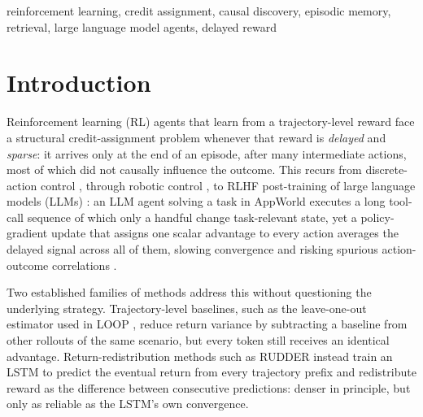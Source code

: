 \documentclass[conference]{IEEEtran}
\begin{document}
\begin{abstract}
explicitly identifying and weighting the causally relevant steps of a trajectory is a more sample-efficient credit-assignment strategy than either an undifferentiated trajectory-level baseline or a learned return-redistribution network; the AppWorld result, constrained to a single seed per arm by the 2-GPU budget available for this project, is reported as a compute-limited demonstration that the same mechanism is compatible with an improvement at a harder, partially observed, natural-language scale, not as an independent statistical confirmation of it.
\end{abstract}

\begin{IEEEkeywords}
reinforcement learning, credit assignment, causal discovery, episodic memory, retrieval, large language model agents, delayed reward
\end{IEEEkeywords}

\section{Introduction}
\label{sec:introduction}

Reinforcement learning (RL) agents that learn from a trajectory-level reward face a structural credit-assignment problem whenever that reward is \emph{delayed} and \emph{sparse}: it arrives only at the end of an episode, after many intermediate actions, most of which did not causally influence the outcome. This recurs from discrete-action control \cite{b_mnih2015dqn}, through robotic control \cite{b_lillicrap2016ddpg,b_silver2017alphazero}, to RLHF post-training of large language models (LLMs) \cite{b_christiano2017rlhf,b_bai2022hhrlhf,b_ouyang2022instructgpt}: an LLM agent solving a task in AppWorld \cite{b_trivedi2024appworld} executes a long tool-call sequence of which only a handful change task-relevant state, yet a policy-gradient update that assigns one scalar advantage to every action averages the delayed signal across all of them, slowing convergence and risking spurious action-outcome correlations \cite{b_amodei2016concrete,b_chang2020invariant}.

Two established families of methods address this without questioning the underlying strategy. Trajectory-level baselines, such as the leave-one-out estimator used in LOOP \cite{b_chen2025loop}, reduce return variance by subtracting a baseline from other rollouts of the same scenario, but every token still receives an identical advantage. Return-redistribution methods such as RUDDER \cite{b_arjonaibarra2019rudder} instead train an LSTM to predict the eventual return from every trajectory prefix and redistribute reward as the difference between consecutive predictions: denser in principle, but only as reliable as the LSTM's own convergence.
\end{document}
